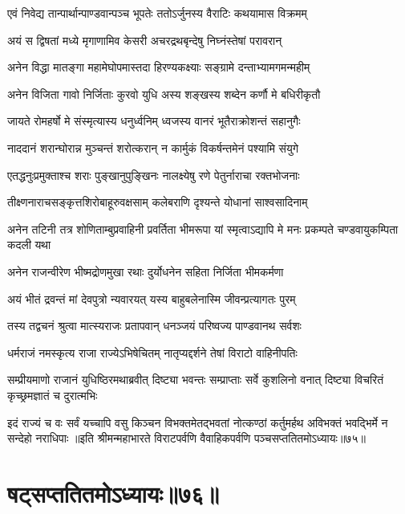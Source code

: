 
\twolineshloka
{एवं निवेद्य तान्पार्थान्पाण्डवान्पञ्च भूपतेः}
{ततोऽर्जुनस्य वैराटिः कथयामास विक्रमम्}


\twolineshloka
{अयं स द्विषतां मध्ये मृगाणामिव केसरी}
{अचरद्रथबृन्देषु निघ्नंस्तेषां परावरान्}


\twolineshloka
{अनेन विद्धा मातङ्गा महामेघोपमास्तदा}
{हिरण्यकक्ष्याः सङ्ग्रामे दन्ताभ्यामगमन्महीम्}


\twolineshloka
{अनेन विजिता गावो निर्जिताः कुरवो युधि}
{अस्य शङ्खस्य शब्देन कर्णौ मे बधिरीकृतौ}


\twolineshloka
{जायते रोमहर्षो मे संस्मृत्यास्य धनुर्ध्वनिम्}
{ध्वजस्य वानरं भूतैराक्रोशन्तं सहानुगैः}


\twolineshloka
{नाददानं शरान्घोरान्न मुञ्चन्तं शरोत्करान्}
{न कार्मुकं विकर्षन्तमेनं पश्यामि संयुगे}


\twolineshloka
{एतद्धनुःप्रमुक्ताश्च शराः पुङ्खानुपुङ्खिनः}
{नालक्ष्येषु रणे पेतुर्नाराचा रक्तभोजनाः}


\twolineshloka
{तीक्ष्णनाराचसङ्कृत्तशिरोबाहूरुवक्षसाम्}
{कलेबराणि दृश्यन्ते योधानां साश्वसादिनाम्}


\threelineshloka
{अनेन तटिनी तत्र शोणिताम्बुप्रवाहिनी}
{प्रवर्तिता भीमरूपा यां स्मृत्वाऽद्यापि मे मनः}
{प्रकम्पते चण्डवायुकम्पिता कदली यथा}


\twolineshloka
{अनेन राजन्वीरेण भीष्मद्रोणमुखा रथाः}
{दुर्योधनेन सहिता निर्जिता भीमकर्मणा}


\twolineshloka
{अयं भीतं द्रवन्तं मां देवपुत्रो न्यवारयत्}
{यस्य बाहुबलेनास्मि जीवन्प्रत्यागतः पुरम्}



\twolineshloka
{तस्य तद्वचनं श्रुत्वा मात्स्यराजः प्रतापवान्}
{धनञ्जयं परिष्वज्य पाण्डवानथ सर्वशः}


\twolineshloka
{धर्मराजं नमस्कृत्य राजा राज्येऽभिषेचितम्}
{नातृप्यद्दर्शने तेषां विराटो वाहिनीपतिः}


\threelineshloka
{सम्प्रीयमाणो राजानं युधिष्ठिरमथाब्रवीत्}
{दिष्ट्या भवन्तः सम्प्राप्ताः सर्वे कुशलिनो वनात्}
{दिष्ट्या विचरितं कृच्छ्रमज्ञातं च दुरात्मभिः}


\threelineshloka
{इदं राज्यं च वः सर्वं यच्चापि वसु किञ्चन}
{विभक्तमेतद्भवतां नोत्कण्ठां कर्तुमर्हथ}
{अविभक्तं भवद्भिर्मे न सन्देहो नराधिपाः}
॥इति श्रीमन्महाभारते विराटपर्वणि वैवाहिकपर्वणि पञ्चसप्ततितमोऽध्यायः॥७५॥

\chapter{षट्सप्ततितमोऽध्यायः॥७६॥}

